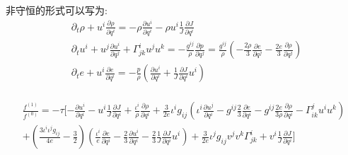 \documentclass[LBMDerivation.tex]{subfiles}
\begin{document}
非守恒的形式可以写为:
\begin{equation}
  \begin{aligned}
     & \partial_{t} \rho+ u^i \frac{\partial \rho}{\partial q^i}=-\rho \frac{\partial u^i}{\partial q^i}-\rho u^i \frac{1}{J} \frac{\partial J}{\partial q^i}
    \\
     & \partial_{t}u^{i}+u^j \frac{\partial u^i}{\partial q^{j}}+\Gamma_{j k}^{i}  u^{j} u^{k}=-\frac{g^{i j}}{\rho} \frac{\partial p}{\partial q^{j}}= \frac{g^{i j}}{\rho} (-\frac{2\rho}{3}\frac{\partial e}{\partial q^j} - \frac{2e}{3}\frac{\partial \rho}{\partial q^j}) \\
     & \partial_{t}e + u^i\frac{\partial e}{\partial  q^{i}}  = -  \frac{p}{\rho} (\frac{\partial  u^i}{\partial q^{i}}  + \frac{1}{J} \frac{\partial J}{\partial q^i}u^i)                                                                                                      \\
  \end{aligned}
  \label{EQUATION::Eluer非守恒} ~
\end{equation}


\begin{equation}
  \begin{gathered}
    \frac{f^{(1)}}{f^{(0)}}=
    -\tau [ -\frac{\partial u^i}{\partial q^i} -u^i \frac{1}{J} \frac{\partial J}{\partial q^i}  + \frac{\iota^i}{\rho} \frac{\partial \rho}{\partial q^i} +\frac{3}{2e}\iota^i g_{ij} (\iota^i \frac{\partial u^j}{\partial q^i}-g^{ij}\frac{2}{3}\frac{\partial e}{\partial q^i}-g^{ij}\frac{2e}{3\rho}\frac{\partial \rho}{\partial q^i}-\Gamma_{ik}^j u^iu^k) \\
    + (\frac{3 {\iota^i\iota^jg_{ij}}}{4e}-\frac{3}{2}) (\frac{\iota^i}{e}\frac{\partial e}{\partial q^i}-\frac{2}{3}\frac{\partial u^i}{\partial q^i}-\frac{2}{3}\frac{1}{J} \frac{\partial J}{\partial q^i}u^i) + \frac{3}{2e}\iota^j g_{ij} v^{j} v^{k} \Gamma_{j k}^{i} + v^i  \frac{1}{J}\frac{\partial J}{\partial q^i}
    ]
  \end{gathered}
\end{equation}
\end{document}
